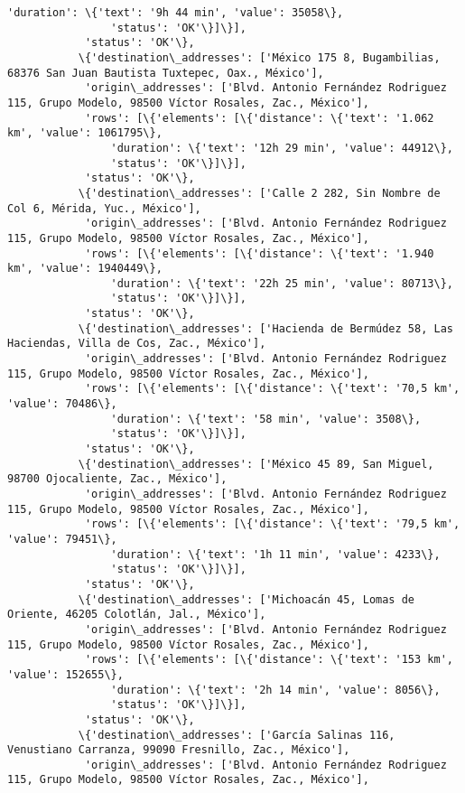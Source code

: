 \documentclass[11pt]{article}
\begin{document}
\begin{Verbatim}[commandchars=\\\{\}]
                'duration': \{'text': '9h 44 min', 'value': 35058\},
                'status': 'OK'\}]\}],
            'status': 'OK'\},
           \{'destination\_addresses': ['México 175 8, Bugambilias, 68376 San Juan Bautista Tuxtepec, Oax., México'],
            'origin\_addresses': ['Blvd. Antonio Fernández Rodriguez 115, Grupo Modelo, 98500 Víctor Rosales, Zac., México'],
            'rows': [\{'elements': [\{'distance': \{'text': '1.062 km', 'value': 1061795\},
                'duration': \{'text': '12h 29 min', 'value': 44912\},
                'status': 'OK'\}]\}],
            'status': 'OK'\},
           \{'destination\_addresses': ['Calle 2 282, Sin Nombre de Col 6, Mérida, Yuc., México'],
            'origin\_addresses': ['Blvd. Antonio Fernández Rodriguez 115, Grupo Modelo, 98500 Víctor Rosales, Zac., México'],
            'rows': [\{'elements': [\{'distance': \{'text': '1.940 km', 'value': 1940449\},
                'duration': \{'text': '22h 25 min', 'value': 80713\},
                'status': 'OK'\}]\}],
            'status': 'OK'\},
           \{'destination\_addresses': ['Hacienda de Bermúdez 58, Las Haciendas, Villa de Cos, Zac., México'],
            'origin\_addresses': ['Blvd. Antonio Fernández Rodriguez 115, Grupo Modelo, 98500 Víctor Rosales, Zac., México'],
            'rows': [\{'elements': [\{'distance': \{'text': '70,5 km', 'value': 70486\},
                'duration': \{'text': '58 min', 'value': 3508\},
                'status': 'OK'\}]\}],
            'status': 'OK'\},
           \{'destination\_addresses': ['México 45 89, San Miguel, 98700 Ojocaliente, Zac., México'],
            'origin\_addresses': ['Blvd. Antonio Fernández Rodriguez 115, Grupo Modelo, 98500 Víctor Rosales, Zac., México'],
            'rows': [\{'elements': [\{'distance': \{'text': '79,5 km', 'value': 79451\},
                'duration': \{'text': '1h 11 min', 'value': 4233\},
                'status': 'OK'\}]\}],
            'status': 'OK'\},
           \{'destination\_addresses': ['Michoacán 45, Lomas de Oriente, 46205 Colotlán, Jal., México'],
            'origin\_addresses': ['Blvd. Antonio Fernández Rodriguez 115, Grupo Modelo, 98500 Víctor Rosales, Zac., México'],
            'rows': [\{'elements': [\{'distance': \{'text': '153 km', 'value': 152655\},
                'duration': \{'text': '2h 14 min', 'value': 8056\},
                'status': 'OK'\}]\}],
            'status': 'OK'\},
           \{'destination\_addresses': ['García Salinas 116, Venustiano Carranza, 99090 Fresnillo, Zac., México'],
            'origin\_addresses': ['Blvd. Antonio Fernández Rodriguez 115, Grupo Modelo, 98500 Víctor Rosales, Zac., México'],

\end{Verbatim}
\end{document}
